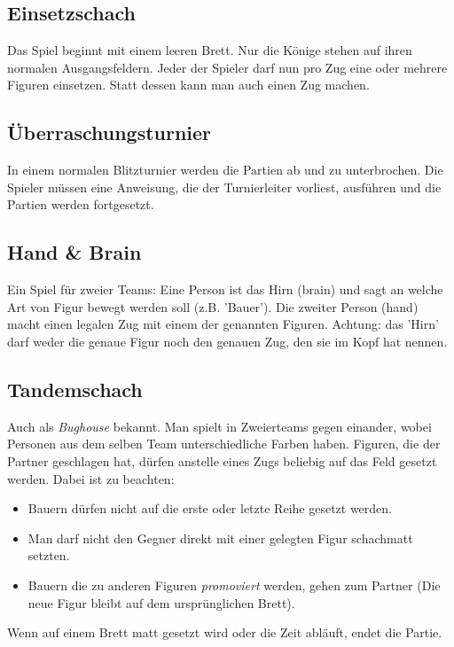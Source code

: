 \documentclass{article}
\begin{document}
\subsection{Einsetzschach}

Das Spiel beginnt mit einem leeren Brett. Nur die Könige stehen auf ihren normalen Ausgangsfeldern. Jeder der Spieler darf nun pro Zug eine oder mehrere Figuren einsetzen. Statt dessen kann man auch einen Zug machen.


\subsection{\"Uberraschungsturnier}

In einem normalen Blitzturnier werden die Partien ab und zu unterbrochen. Die Spieler müssen eine Anweisung, die der Turnierleiter vorliest, ausführen und die Partien werden fortgesetzt.

\subsection{Hand \& Brain}
Ein Spiel für zweier Teams: Eine Person ist das Hirn (brain) und sagt an welche Art von Figur bewegt werden soll (z.B. 'Bauer'). Die zweiter Person (hand) macht einen legalen Zug mit einem der genannten Figuren. Achtung: das 'Hirn' darf weder die genaue Figur noch den genauen Zug, den sie im Kopf hat nennen.




\subsection{Tandemschach}
Auch als \emph{Bughouse} bekannt. Man spielt in Zweierteams gegen einander, wobei Personen aus dem selben Team unterschiedliche Farben haben. Figuren, die der Partner geschlagen hat, dürfen anstelle eines Zugs beliebig auf das Feld gesetzt werden. Dabei ist zu beachten:
\begin{itemize}
\item Bauern dürfen nicht auf die erste oder letzte Reihe gesetzt werden.
\item Man darf nicht den Gegner direkt mit einer gelegten Figur schachmatt setzten.
\item Bauern die zu anderen Figuren \emph{promoviert} werden, gehen zum Partner (Die neue Figur bleibt auf dem ursprünglichen Brett).
\end{itemize}

Wenn auf einem Brett matt gesetzt wird oder die Zeit abläuft, endet die Partie.
\end{document}
